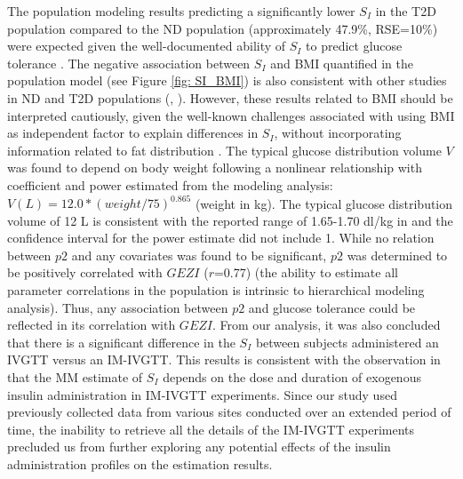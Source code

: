 \documentclass[utf8]{frontiersSCNS} %
\begin{document}
The population modeling results predicting a significantly lower $S_I$ in the T2D population compared to the ND population (approximately 47.9\%, RSE=10\%) were expected given the well-documented ability of $S_I$ to predict glucose tolerance \citep{Bergman1997TheTolerance}. The negative association between $S_I$ and BMI quantified in the population model (see Figure \ref{fig: SI_BMI}) is also consistent with other studies in ND and T2D populations (\citet{welch_1990}, \citet{Morettini_2019}).  However, these results related to BMI should be interpreted cautiously, given the well-known challenges associated with using BMI as independent factor to explain differences in $S_I$, without incorporating information related to fat distribution \citep{Klein_2007}. The typical glucose distribution volume $V$ was found to depend on body weight following a nonlinear relationship with coefficient and power estimated from the modeling analysis: $V (L)=12.0*(weight/75)^{0.865}$ (weight in kg). The typical glucose distribution volume of 12 L is  consistent with the reported range of 1.65-1.70 dl/kg in \citet{Denti2010} and the confidence interval for the power estimate did not include 1. While no relation between $p2$ and any covariates was found to be significant, $p2$ was determined to be positively correlated with $GEZI$ ($r$=0.77) (the ability to estimate all parameter correlations in the population is intrinsic to hierarchical modeling analysis). Thus, any association between $p2$ and glucose tolerance could be reflected in its correlation with $GEZI$. From our analysis, it was also concluded that there is a significant difference in the $S_I$ between subjects administered an IVGTT versus an IM-IVGTT. This results is consistent with the observation in \citet{Ward2001} that the MM estimate of $S_I$ depends on the dose and duration of exogenous insulin administration in IM-IVGTT experiments. Since our study used previously collected data from various sites conducted over an extended period of time, the inability to retrieve all the details of the IM-IVGTT experiments precluded us from further exploring any potential effects of the insulin administration profiles on the estimation results.
\end{document}
